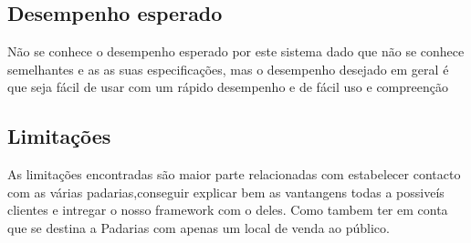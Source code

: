 \subsection{Desempenho esperado}
Não se conhece o desempenho esperado por este sistema dado que não se conhece semelhantes e as as suas especificações, mas o desempenho desejado em geral é que seja fácil de usar com um rápido desempenho e de fácil uso e compreenção
\subsection{Limitações} 
As limitações encontradas são maior parte relacionadas com estabelecer contacto com as várias padarias,conseguir explicar bem as vantangens todas a possiveís clientes e intregar o nosso framework com o deles. Como tambem ter em conta que se destina a Padarias com apenas um local de venda ao público.